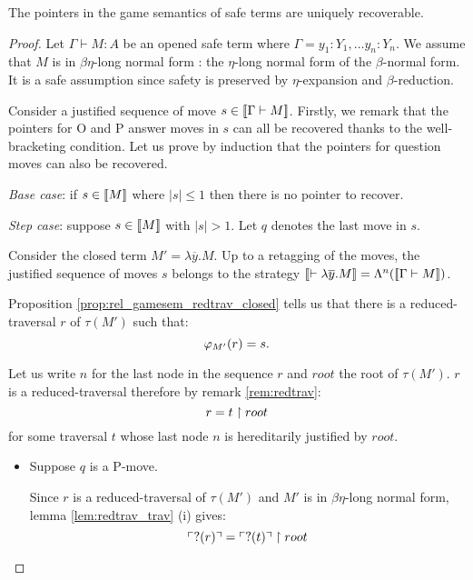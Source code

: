 \begin{prop}
The pointers in the game semantics of safe terms are
uniquely recoverable.
\end{prop}

\begin{proof}
Let $\Gamma \vdash M : A$ be an opened safe term where $\Gamma = y_1:Y_1, \ldots y_n:Y_n$.
We assume that $M$ is in $\beta \eta$-long normal form : the $\eta$-long normal form of the $\beta$-normal form.
It is a safe assumption since safety is preserved by $\eta$-expansion and $\beta$-reduction.

Consider a justified sequence of move $s \in {[\![\Gamma \vdash M ]\!]}$. Firstly,
we remark that the pointers for O and P answer moves in $s$ can all be
recovered thanks to the well-bracketing condition.
Let us prove by induction that the pointers for question moves can also be recovered.

\emph{Base case}: if $s \in {[\![M ]\!]}$ where $|s| \leq 1$ then there is no pointer to recover.

\emph{Step case}: suppose $s \in {[\![M ]\!]}$ with $|s| > 1$. Let $q$ denotes the last move in $s$.

Consider the closed term $M'  = \lambda \overline{y} . M$.
Up to a retagging of the moves, the justified sequence of moves $s$ belongs to the strategy
${[\![ \vdash \lambda \overline{y} . M ]\!]} = \Lambda^n({[\![ \Gamma \vdash M ]\!]})$.

Proposition \ref{prop:rel_gamesem_redtrav_closed} tells us that
there is a reduced-traversal $r$ of $\tau(M')$ such that:
$$\varphi_{M'}(r) = s.$$

Let us write $n$ for the last node in the sequence $r$
and $root$ the root of $\tau(M')$.
$r$ is a reduced-traversal therefore by remark \ref{rem:redtrav}:
$$ r = t \upharpoonright  root  $$
for some traversal $t$ whose last node $n$ is hereditarily justified by $root$.

\begin{itemize}
\item Suppose $q$ is a P-move.

Since $r$ is a reduced-traversal of $\tau(M')$ and $M'$ is in $\beta
\eta$-long normal form, lemma \ref{lem:redtrav_trav} (i) gives:
\begin{equation}
 \ulcorner ?(r) \urcorner = \ulcorner ?(t) \urcorner \upharpoonright  root  \label{eq:pre_pview_r}
\end{equation}



\end{itemize}
\end{proof}
